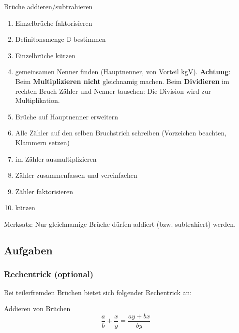 \begin{rezept}{Brüche addieren/subtrahieren}{}\label{bruchtermeRezept}
\begin{enumerate}
	\item Einzelbrüche faktorisieren
  \item Definitonsmenge $\mathbb{D}$ bestimmen
	\item Einzelbrüche kürzen
	\item gemeinsamen Nenner finden (Hauptnenner, von Vorteil
	kgV). \textbf{Achtung}: Beim \textbf{Multiplizieren nicht}
	gleichnamig machen. Beim \textbf{Dividieren} im rechten Bruch Zähler
	und Nenner tauschen: Die Division wird zur Multiplikation.
	\item Brüche auf Hauptnenner erweitern
	\item Alle Zähler auf den selben Bruchstrich schreiben (Vorzeichen beachten, Klammern setzen)
	\item im Zähler ausmultiplizieren
	\item Zähler zusammenfassen und vereinfachen
	\item Zähler faktorisieren
	\item kürzen
\end{enumerate}
\end{rezept}


\begin{gesetz}{}{}
Merksatz: Nur gleichnamige Brüche dürfen addiert (bzw. subtrahiert)
werden.
\end{gesetz}



\subsection*{Aufgaben}

%

\newpage

\subsubsection{Rechentrick (optional)}
Bei teilerfremden Brüchen bietet sich folgender Rechentrick an:

\begin{gesetz}{Addieren von Brüchen}{}
$$\frac{a}{b} + \frac{x}{y} = \frac{ay + bx}{by}$$
\end{gesetz}

\newcommand{\miniPlatz}[1]{\noTRAINER{\,\,\,\,\,\,}\TRAINER{#1}}

